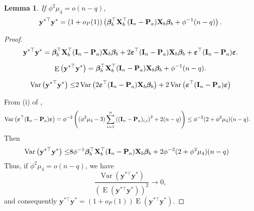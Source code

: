 \documentclass[11pt]{article}
\DeclareMathOperator{\myE}{E}
\DeclareMathOperator{\myVar}{Var}
\newcommand{\By}{\mathbf{y}}    \newcommand{\Bz}{\mathbf{z}}
\newcommand{\bfsym}[1]{\ensuremath{\boldsymbol{#1}}}
\def\bbeta{\bfsym \beta}
\theoremstyle{plain}
\newtheorem{lemma}{\quad\quad Lemma}
\theoremstyle{definition}
\theoremstyle{remark}
\begin{document}
\begin{lemma}
If $\phi^2\mu_4=o(n-q)$,
\begin{equation*}
    \By^{*\top} \By^*=(1+o_P(1))
    \left(
    \bbeta_b^\top \BX_b^\top (\BI_n-\BP_a) \BX_b \bbeta_b
    + \phi^{-1}(n-q)
\right).
\end{equation*}
\end{lemma}
\begin{proof}
\begin{equation*}
    \By^{*\top} \By^* = \bbeta_b^\top \BX_b^\top (\BI_n-\BP_a) \BX_b \bbeta_b
    +2 \bepsilon^\top (\BI_n -\BP_a) \BX_b \bbeta_b + \bepsilon^\top (\BI_n - \BP_a) \bepsilon.
\end{equation*}


\begin{equation*}
    \myE \left(\By^{*\top} \By^*\right) = \bbeta_b^\top \BX_b^\top (\BI_n-\BP_a) \BX_b \bbeta_b
    + \phi^{-1}(n-q).
\end{equation*}


\begin{equation*}
    \begin{split}
    \myVar \left( \By^{*\top} \By^* \right) 
    \leq  &
    2\myVar \left( 2 \bepsilon^\top (\BI_n -\BP_a) \BX_b \bbeta_b \right) + 2\myVar \left( \bepsilon^\top (\BI_n - \BP_a) \bepsilon \right)
    \\
    \end{split}
\end{equation*}

From (i) of \cite[Proposition A.1]{chen2010tests},
\begin{equation*}
    \begin{split}
\myVar\left( \bepsilon^\top (\BI_n - \BP_a) \bepsilon \right)
&=
\phi^{-2}\left(
    (\phi^2 \mu_4 - 3) \sum_{i=1}^n \left((\BI_n -\BP_a)_{i,i}\right)^2
    + 2(n-q)
\right)
    \leq
    \phi^{-2}(2+\phi^2 \mu_4)(n-q)
    .
    \end{split}
\end{equation*}
Then
\begin{equation*}
    \begin{split}
    \myVar \left( \By^{*\top} \By^* \right) 
    \leq  &
    8 \phi^{-1} \bbeta_b^\top \BX_b^\top (\BI_n -\BP_a) \BX_b \bbeta_b 
    +
    2 \phi^{-2} (2+\phi^2 \mu_4) (n-q)
    \end{split}
\end{equation*}
Thus, if $\phi^2\mu_4=o(n-q)$, we have
\begin{equation*}
    \frac{
        \myVar \left( \By^{*\top} \By^* \right) 
    }{
        \left(\myE \left( \By^{*\top} \By^* \right) \right)^2
    }
    \to 0,
\end{equation*}
and consequently $\By^{*\top} \By^*=(1+o_P(1))\myE (\By^{*\top} \By^*)$.

\end{proof}
\end{document}

